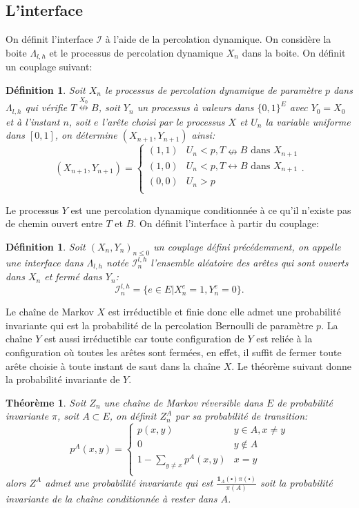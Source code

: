 \documentclass[titlepage,a4paper,11pt]{article}
\newcounter{def}
\newcounter{thm}
\newtheorem{couplage}[def]{Définition}
\newtheorem{interface}[def]{Définition}
\newtheorem{probainv}[thm]{Théorème}
\newcommand{\connect}{\leftrightarrow}
\newcommand{\nconnect}{\nleftrightarrow}
\begin{document}
\subsection{L'interface}
On définit l'interface $\mathcal{I}$ à l'aide de la percolation dynamique. On considère la boite $\Lambda_{l,h}$ et le processus de percolation dynamique $X_n$ dans la boite. On définit un couplage suivant:
\begin{couplage}
Soit $X_n$ le processus de percolation dynamique de paramètre $p$ dans $\Lambda_{l,h}$ qui vérifie $T\overset{X_0}{\nconnect}B$, soit $Y_n$ un processus à valeurs dans $\{0,1\}^E$ avec $Y_0=X_0$ et à l'instant $n$, soit $e$ l'arête choisi par le processus $X$ et $U_n$ la variable uniforme dans $[0,1]$, on détermine $(X_{n+1},Y_{n+1})$ ainsi:
$$(X_{n+1},Y_{n+1})=\left\lbrace \begin{array}{cc}
(1,1) & U_n<p,T\nconnect B \text{ dans } X_{n+1}\\
(1,0) & U_n<p,T\connect B \text{ dans } X_{n+1} \\
(0,0) & U_n>p\\
\end{array}\right..$$
\end{couplage}
Le processus $Y$ est une percolation dynamique conditionnée à ce qu'il n'existe pas de chemin ouvert entre $T$ et $B$. On définit l'interface à partir du couplage:
\begin{interface}
Soit $(X_n,Y_n)_{n\leqslant 0}$ un couplage défini précédemment, on appelle une interface dans $\Lambda_{l,h}$ notée $\mathcal{I}^{l,h}_n$ l'ensemble aléatoire des arêtes qui sont ouverts dans $X_n$ et fermé dans $Y_n$: $$ \mathcal{I}^{l,h}_n = \big\{ e\in E| X_n^e = 1, Y_n^e = 0 \big\}.
$$
\end{interface}
Le chaîne de Markov $X$ est irréductible et finie donc elle admet une probabilité invariante qui est la probabilité de la percolation Bernoulli de paramètre $p$. La chaîne $Y$ est aussi irréductible car toute configuration de $Y$ est reliée à la configuration où toutes les arêtes sont fermées, en effet, il suffit de fermer toute arête choisie à toute instant de saut dans la chaîne $X$. Le théorème suivant donne la probabilité invariante de $Y$.
\begin{probainv}
Soit $Z_n$ une chaîne de Markov réversible dans $E$ de probabilité invariante $\pi$, soit $A\subset E$, on définit $Z_n^A$ par sa probabilité de transition:
$$p^A(x,y)=\left\lbrace \begin{array}{cc}
p(x,y) & y\in A, x\neq y \\
0 & y\notin A \\
1-\sum_{y\neq x}p^A(x,y) & x = y\\
\end{array}
\right.
$$
alors $Z^A$ admet une probabilité invariante qui est $\frac{\mathbf{1}_A(\centerdot)\pi(\centerdot)}{\pi(A)}$ soit la probabilité invariante de la chaîne conditionnée à rester dans $A$.
\end{probainv}
\end{document}
